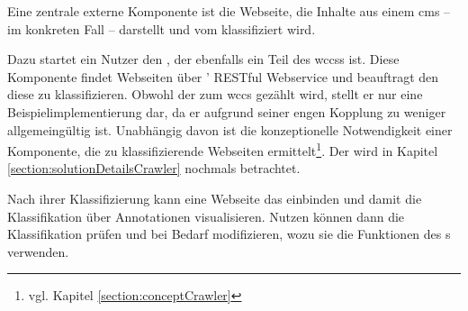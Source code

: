         Eine zentrale externe Komponente ist die Webseite,
        die Inhalte aus einem \gls{cms} -- im konkreten Fall {\wordpress} --
        darstellt und vom {\classificationService} klassifiziert wird.
        
        Dazu startet ein Nutzer den {\wordpressCrawler}, der ebenfalls ein Teil des \glspl{wccs} ist.
        Diese Komponente findet Webseiten über {\wordpress}' RESTful Webservice und beauftragt den
        {\classificationService} diese zu klassifizieren.
        Obwohl der {\wordpressCrawler} zum \gls{wccs} gezählt wird,
        stellt er nur eine Beispielimplementierung dar,
        da er aufgrund seiner engen Kopplung zu {\wordpress} weniger allgemeingültig ist.
        Unabhängig davon ist die konzeptionelle Notwendigkeit einer Komponente,
        die zu klassifizierende Webseiten ermittelt\footnote{vgl. Kapitel \ref{section:conceptCrawler}}.
        Der {\wordpressCrawler} wird in Kapitel \ref{section:solutionDetailsCrawler} nochmals betrachtet.

        Nach ihrer Klassifizierung kann eine Webseite das {\annotatorPlugin} einbinden
        und damit die Klassifikation über Annotationen visualisieren.
        Nutzen können dann die Klassifikation prüfen und bei Bedarf modifizieren,
        wozu sie die Funktionen des {\annotatorPlugin}s verwenden.
